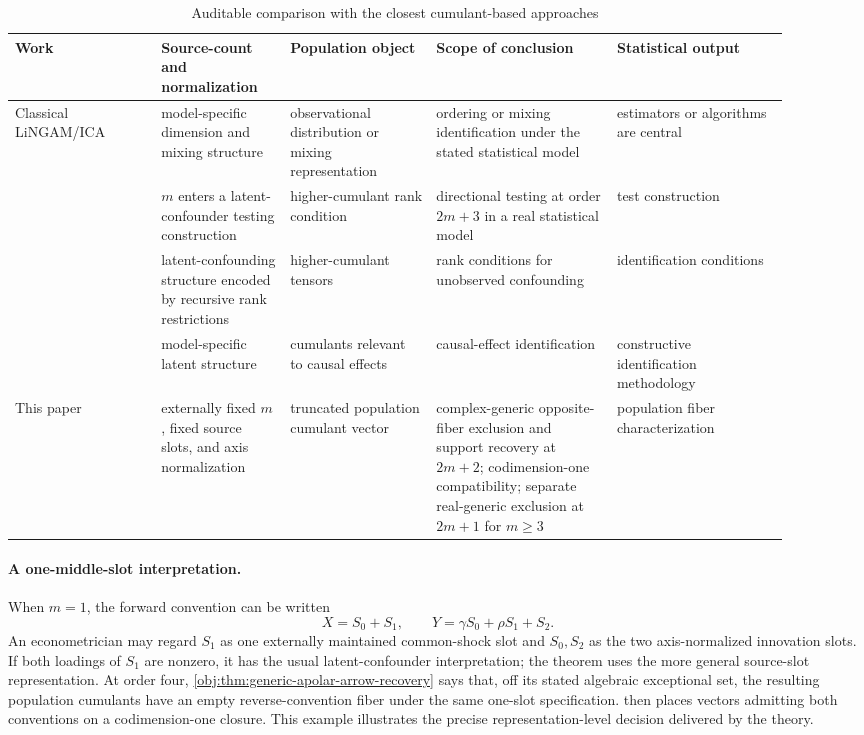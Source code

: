 \documentclass[11pt]{article}
\begin{document}
\begin{table}[ht]
\centering
\scriptsize
\caption{Auditable comparison with the closest cumulant-based approaches}
\begin{tabular}{p{0.17\linewidth}p{0.15\linewidth}p{0.17\linewidth}p{0.21\linewidth}p{0.20\linewidth}}
\hline
Work & Source-count and normalization & Population object & Scope of conclusion & Statistical output \\
\hline
Classical LiNGAM/ICA & model-specific dimension and mixing structure & observational distribution or mixing representation & ordering or mixing identification under the stated statistical model & estimators or algorithms are central \\
\citet{ChenPengHuangEtAl2025Direction} & \(m\) enters a latent-confounder testing construction & higher-cumulant rank condition & directional testing at order \(2m+3\) in a real statistical model & test construction \\
\citet{SchkodaRobevaDrton2024} & latent-confounding structure encoded by recursive rank restrictions & higher-cumulant tensors & rank conditions for unobserved confounding & identification conditions \\
\citet{TramontanoKivvaSalehkaleybarDrtonKiyavash2024,TramontanoKivvaSalehkaleybarDrtonKiyavash2025} & model-specific latent structure & cumulants relevant to causal effects & causal-effect identification & constructive identification methodology \\
This paper & externally fixed \(m\), fixed source slots, and axis normalization & truncated population cumulant vector & complex-generic opposite-fiber exclusion and support recovery at \(2m+2\); codimension-one compatibility; separate real-generic exclusion at \(2m+1\) for \(m\ge3\) & population fiber characterization \\
\hline
\end{tabular}
\end{table}

\paragraph{A one-middle-slot interpretation.}
When \(m=1\), the forward convention can be written
\[
X=S_0+S_1,\qquad
Y=\gamma S_0+\rho S_1+S_2.
\]
An econometrician may regard \(S_1\) as one externally maintained common-shock slot and \(S_0,S_2\) as the two axis-normalized innovation slots. If both loadings of \(S_1\) are nonzero, it has the usual latent-confounder interpretation; the theorem uses the more general source-slot representation. At order four, \cref{obj:thm:generic-apolar-arrow-recovery} says that, off its stated algebraic exceptional set, the resulting population cumulants have an empty reverse-convention fiber under the same one-slot specification.  then places vectors admitting both conventions on a codimension-one closure. This example illustrates the precise representation-level decision delivered by the theory.
\end{document}
